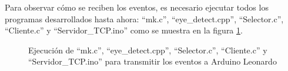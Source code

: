 Para observar cómo se reciben los eventos, es necesario ejecutar todos los programas desarrollados hasta ahora: ``mk.c'', ``eye\_detect.cpp'', ``Selector.c'', ``Cliente.c'' y ``Servidor\_TCP.ino'' como se muestra en la figura \ref{fig:programas}.


\begin{figure}[htbp]
\centering
{}
\caption{Ejecución de ``mk.c'', ``eye\_detect.cpp'', ``Selector.c'', ``Cliente.c'' y ``Servidor\_TCP.ino'' para transmitir los eventos a Arduino Leonardo}
\label{fig:programas}
\end{figure}

